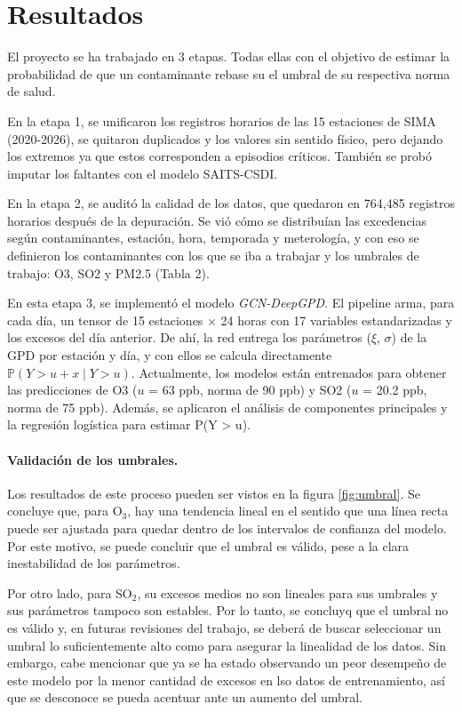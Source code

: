 \documentclass[11pt]{article}
\begin{document}
\section{Resultados} %
El proyecto se ha trabajado en 3 etapas. Todas ellas con el objetivo de estimar la probabilidad de que un contaminante rebase su el umbral de su respectiva norma de salud. 

En la etapa 1, se unificaron los registros horarios de las 15 estaciones de SIMA (2020-2026), se quitaron duplicados y los valores sin sentido físico, pero dejando los extremos ya que estos corresponden a episodios críticos. También se probó imputar los faltantes con el modelo SAITS-CSDI.

En la etapa 2, se auditó la calidad de los datos, que quedaron en 764,485 registros horarios después de la depuración. Se vió cómo se distribuían las excedencias según contaminantes, estación, hora, temporada y meterología, y con eso se definieron los contaminantes con los que se iba a trabajar y los umbrales de trabajo: O3, SO2 y PM2.5 (Tabla 2).

En esta etapa 3, se implementó el modelo \textit{GCN-DeepGPD}. El pipeline arma, para cada día, un tensor de 15 estaciones $\times$ 24 horas con 17 variables estandarizadas y los excesos del día anterior. De ahí, la red entrega los parámetros ($\xi$, $\sigma$) de la GPD por estación y día, y con ellos se calcula directamente $\mathbb{P}(Y>u+x \mid Y>u)$.
Actualmente, los modelos están entrenados para obtener las predicciones de O3 ($u$ = 63 ppb, norma de 90 ppb) y SO2 ($u$ = 20.2 ppb, norma de 75 ppb). Además, se aplicaron el análisis de componentes principales y la regresión logística para estimar P(Y > u).

\vspace{-10pt}
\paragraph{Validación de los umbrales.} Los resultados de este proceso pueden ser vistos en la figura \ref{fig:umbral}. Se concluye que, para O$_3$, hay una tendencia lineal en el sentido que una línea recta puede ser ajustada para quedar dentro de los intervalos de confianza del modelo. Por este motivo, se puede concluir que el umbral es válido, pese a la clara inestabilidad de los parámetros.

Por otro lado, para SO$_2$, su excesos medios no son lineales para sus umbrales y sus parámetros tampoco son estables. Por lo tanto, se concluyq que el umbral no es válido y, en futuras revisiones del trabajo, se deberá de buscar seleccionar un umbral lo suficientemente alto como para asegurar la linealidad de los datos. Sin embargo, cabe mencionar que ya se ha estado observando un peor desempeño de este modelo por la menor cantidad de excesos en lso datos de entrenamiento, así que se desconoce se pueda acentuar ante un aumento del umbral.
\end{document}
